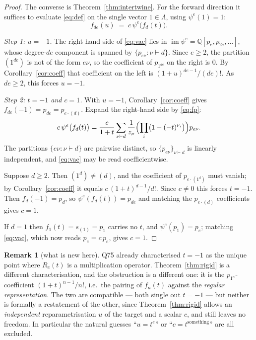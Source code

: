 \documentclass[11pt]{article}
\theoremstyle{definition}
\newtheorem{remark}[theorem]{Remark}
\newcommand{\Q}{\mathbb{Q}}
\newcommand{\Lam}{\Lambda}
\newcommand{\im}{\operatorname{im}}
\begin{document}
\begin{proof}
The converse is Theorem~\ref{thm:intertwine}.  For the forward direction it suffices to
evaluate \eqref{eq:def} on the single vector $1\in\Lam$, using $\psi^{e}(1)=1$:
\begin{equation}\label{eq:vac}
  f_{de}(u)\;=\;c\,\psi^{e}\bigl(f_d(t)\bigr).
\end{equation}

\emph{Step 1: $u=-1$.}  The right-hand side of \eqref{eq:vac} lies in
$\im\psi^{e}=\Q[p_e,p_{2e},\dots]$, whose degree-$de$ component is spanned by
$\{p_{e\nu}:\nu\vdash d\}$.  Since $e\ge2$, the partition $(1^{de})$ is not of the form
$e\nu$, so the coefficient of $p_{1^{de}}$ on the right is $0$.  By
Corollary~\ref{cor:coeff} that coefficient on the left is $(1+u)^{de-1}/(de)!$.  As
$de\ge2$, this forces $u=-1$.

\emph{Step 2: $t=-1$ and $c=1$.}  With $u=-1$, Corollary~\ref{cor:coeff} gives
$f_{de}(-1)=p_{de}=p_{e\cdot(d)}$.  Expand the right-hand side by \eqref{eq:fp}:
\[
  c\,\psi^{e}\bigl(f_d(t)\bigr)
  =\frac{c}{1+t}\sum_{\nu\vdash d}\frac{1}{z_\nu}
   \Bigl(\prod_i\bigl(1-(-t)^{\nu_i}\bigr)\Bigr)p_{e\nu}.
\]
The partitions $\{e\nu:\nu\vdash d\}$ are pairwise distinct, so $\{p_{e\nu}\}_{\nu\vdash d}$
is linearly independent, and \eqref{eq:vac} may be read coefficientwise.

Suppose $d\ge2$.  Then $(1^{d})\neq(d)$, and the coefficient of $p_{e\cdot(1^{d})}$ must
vanish; by Corollary~\ref{cor:coeff} it equals $c\,(1+t)^{d-1}/d!$.  Since $c\neq0$ this
forces $t=-1$.  Then $f_d(-1)=p_d$, so $\psi^{e}(f_d(t))=p_{de}$ and matching the
$p_{e\cdot(d)}$ coefficients gives $c=1$.

If $d=1$ then $f_1(t)=s_{(1)}=p_1$ carries no $t$, and $\psi^{e}(p_1)=p_e$; matching
\eqref{eq:vac}, which now reads $p_{e}=c\,p_{e}$, gives $c=1$.
\end{proof}

\begin{remark}[what is new here]
Q75 already characterised $t=-1$ as the unique point where $R_e(t)$ is a multiplication
operator.  Theorem~\ref{thm:rigid} is a different characterisation, and the obstruction is a
different one: it is the $p_{1^{n}}$-coefficient $(1+t)^{n-1}/n!$, i.e.\ the pairing of
$f_n(t)$ against the \emph{regular representation}.  The two are compatible --- both single
out $t=-1$ --- but neither is formally a restatement of the other, since
Theorem~\ref{thm:rigid} allows an \emph{independent} reparametrisation $u$ of the target and
a scalar $c$, and still leaves no freedom.  In particular the natural guesses
``$u=t^{e}$'' or ``$c=t^{\text{something}}$'' are all excluded.
\end{remark}
\end{document}
